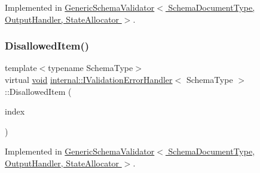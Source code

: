 Implemented in \hyperlink{classGenericSchemaValidator_acc65a322086c792d6534e306c7a091cf}{Generic\+Schema\+Validator$<$ Schema\+Document\+Type, Output\+Handler, State\+Allocator $>$}.

\mbox{\label{classinternal_1_1IValidationErrorHandler_a0ac36d4217d9a14205cbe392601f3ee7}} 
\subsubsection{\texorpdfstring{Disallowed\+Item()}{DisallowedItem()}}
{\footnotesize\ttfamily template$<$typename Schema\+Type$>$ \\
virtual \hyperlink{imgui__impl__opengl3__loader_8h_ac668e7cffd9e2e9cfee428b9b2f34fa7}{void} \hyperlink{classinternal_1_1IValidationErrorHandler}{internal\+::\+I\+Validation\+Error\+Handler}$<$ Schema\+Type $>$\+::Disallowed\+Item (\begin{DoxyParamCaption}\item[{\hyperlink{rapidjson_8h_a5ed6e6e67250fadbd041127e6386dcb5}{Size\+Type}}]{index }\end{DoxyParamCaption})\hspace{0.3cm}{\ttfamily [pure virtual]}}



Implemented in \hyperlink{classGenericSchemaValidator_a2d47a88a3d9fb82466b5bda480b6e70f}{Generic\+Schema\+Validator$<$ Schema\+Document\+Type, Output\+Handler, State\+Allocator $>$}.

\mbox{\label{classinternal_1_1IValidationErrorHandler_a689b8acc4cbe3e8683c1a29950438ac8}} 
